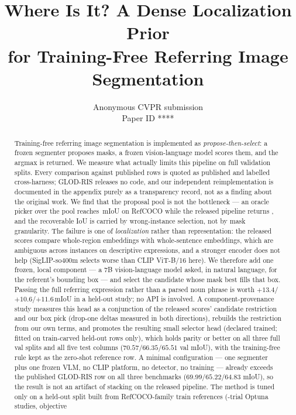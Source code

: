 \documentclass[10pt,twocolumn,letterpaper]{article}
\title{Where Is It? A Dense Localization Prior\\for Training-Free Referring Image Segmentation}
\author{Anonymous CVPR submission\\
Paper ID ****}
\begin{document}
\maketitle

\begin{abstract}
Training-free referring image segmentation is implemented as
\emph{propose-then-select}: a frozen segmenter proposes masks, a frozen
vision-language model scores them, and the argmax is returned. We measure
what actually limits this pipeline on full validation splits. Every
comparison against published rows is quoted as published and labelled
cross-harness; GLOD-RIS releases no code, and our independent reimplementation
is documented in the appendix purely as a transparency record, not as a
finding about the original work. We find
that the proposal pool is not the bottleneck --- an oracle picker over the pool reaches
\oracleRefcoco\,mIoU on RefCOCO while the released pipeline returns
, and the recoverable IoU is carried by wrong-instance
selection, not by mask granularity. The failure is one of \emph{localization}
rather than representation: the released scores compare whole-region
embeddings with whole-sentence embeddings, which are ambiguous across
instances on descriptive expressions, and a stronger encoder does not help
(SigLIP-so400m selects worse than CLIP ViT-B/16 here). We therefore add one
frozen, local component --- a 7B vision-language model asked, in natural
language, for the referent's bounding box --- and select the candidate whose
mask best fills that box. Passing the full referring expression rather than a
parsed noun phrase is worth $+13.4$/$+10.6$/$+11.6$\,mIoU in a held-out study;
no API is involved. A component-provenance study measures this head as a
conjunction of the released scores' candidate restriction and our box pick
(drop-one deltas measured in both directions), rebuilds the restriction from
our own terms, and promotes the resulting small selector head
(declared trained; fitted on train-carved held-out rows only), which holds
parity or better on all three full val splits and all five test columns
($70.57$/$66.35$/$65.51$ val mIoU), with the training-free rule kept as the
zero-shot reference row. A minimal configuration --- one segmenter plus one
frozen VLM, no CLIP platform, no detector, no training --- already exceeds the
published GLOD-RIS row on all three benchmarks ($69.99$/$65.22$/$64.83$ mIoU),
so the result is not an artifact of stacking on the released pipeline. The method is tuned only on a held-out split built
from
RefCOCO-family train references (\studyTrials{}-trial Optuna studies, objective

\end{abstract}
\end{document}
